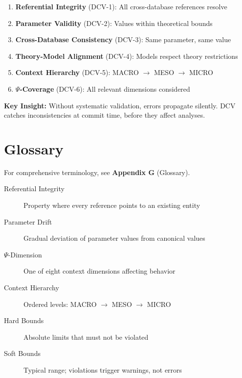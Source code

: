\begin{enumerate}
    \item \textbf{Referential Integrity} (DCV-1): All cross-database references resolve
    \item \textbf{Parameter Validity} (DCV-2): Values within theoretical bounds
    \item \textbf{Cross-Database Consistency} (DCV-3): Same parameter, same value
    \item \textbf{Theory-Model Alignment} (DCV-4): Models respect theory restrictions
    \item \textbf{Context Hierarchy} (DCV-5): MACRO $\to$ MESO $\to$ MICRO
    \item \textbf{$\Psi$-Coverage} (DCV-6): All relevant dimensions considered
\end{enumerate}

\textbf{Key Insight:} Without systematic validation, errors propagate silently. DCV catches inconsistencies at commit time, before they affect analyses.

\section{Glossary}
\label{sec:vc-glossary}

For comprehensive terminology, see \textbf{Appendix G} (Glossary).

\begin{description}
    \item[Referential Integrity] Property where every reference points to an existing entity
    \item[Parameter Drift] Gradual deviation of parameter values from canonical values
    \item[$\Psi$-Dimension] One of eight context dimensions affecting behavior
    \item[Context Hierarchy] Ordered levels: MACRO $\to$ MESO $\to$ MICRO
    \item[Hard Bounds] Absolute limits that must not be violated
    \item[Soft Bounds] Typical range; violations trigger warnings, not errors
\end{description}

